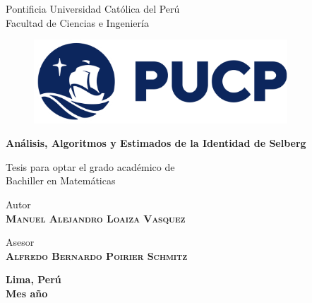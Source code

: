 \thispagestyle{empty}

\bigskip

\begin{center}
  {\baselineskip=30pt \Large Pontificia Universidad Cat\'olica del Per\'u} \\
  {\baselineskip=30pt \large Facultad de Ciencias e Ingenier\'ia}
\end{center}

\bigskip

\begin{figure}[H]
  \begin{center}
    \includegraphics[width=9.5cm]{images/2021-pucp-logo.png}
  \end{center}
\end{figure}

\begin{center}
  \begin{minipage}{14.0cm}
    \begin{center}
      \textcolor{pucp}
      {\textbf{\Huge{An\'alisis, Algoritmos y Estimados de la Identidad
      de Selberg}}}
    \end{center}
  \end{minipage}
\end{center}

\vspace*{2.00cm}

\begin{center}
  Tesis para optar el grado acad\'emico de \\
  Bachiller en Matem\'aticas
\end{center}

\vspace*{2.00cm}

\begin{center}
  Autor \\
  \textbf{\textsc{Manuel Alejandro Loaiza Vasquez}}
\end{center}

\vspace*{0.5cm}

\begin{center}
  Asesor \\
  \textbf{\textsc{Alfredo Bernardo Poirier Schmitz}}
\end{center}

\vspace*{1.00cm}

\begin{center}
  {
    \baselineskip=10pt
    \textbf{Lima, Per\'u} \\
    \textbf{Mes a\~no}
  }
\end{center}
